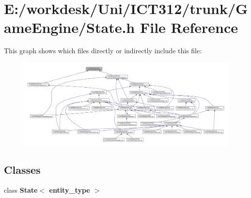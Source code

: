 \section{E\+:/workdesk/\+Uni/\+I\+C\+T312/trunk/\+Game\+Engine/\+State.h File Reference}
\label{_state_8h}
This graph shows which files directly or indirectly include this file\+:
\nopagebreak
\begin{figure}[H]
\begin{center}
\leavevmode
\includegraphics[width=350pt]{de/d24/_state_8h__dep__incl}
\end{center}
\end{figure}
\subsection*{Classes}
\begin{DoxyCompactItemize}
\item 
class {\bf State$<$ entity\+\_\+type $>$}
\end{DoxyCompactItemize}
